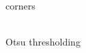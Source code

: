 \documentclass[12pt,a4paper,oneside,openright]{book}
\begin{document}
\begin{CJK}{UTF8}{}
\begin{figure}[htbp]
\begin{center}
\begin{minipage}[t]{.32\textwidth}
      \begin{center}
        \\
        corners
      \end{center}
    \end{minipage}
    \begin{minipage}[t]{.32\textwidth}
      \begin{center}
        \\
        Otsu thresholding
      \end{center}
    \end{minipage}
    \begin{minipage}[t]{.32\textwidth}

\end{minipage}
\end{center}
\end{figure}
\end{CJK}
\end{document}
